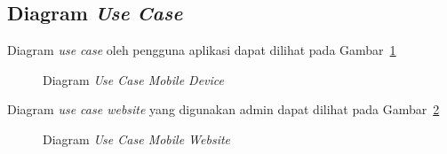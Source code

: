 \subsection{Diagram \textit{Use Case}}

\hspace{0,5cm}Diagram \textit{use case} oleh pengguna aplikasi dapat dilihat pada Gambar~\ref{fig:diagram_use_case_mobile}

\begin{figure}
\centering
{}
\caption[Diagram \textit{Use Case Mobile Device}]{Diagram \textit{Use Case Mobile Device}} 
\label{fig:diagram_use_case_mobile}
\end{figure}

Diagram \textit{use case website} yang digunakan admin dapat dilihat pada Gambar~\ref{fig:diagram_use_case_website}

\begin{figure}
\centering
{}
\caption[Diagram \textit{Use Case Mobile Website}]{Diagram \textit{Use Case Mobile Website}} 
\label{fig:diagram_use_case_website}
\end{figure}